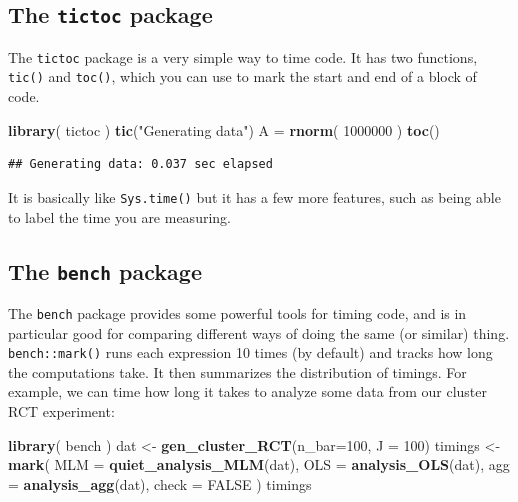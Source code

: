 \documentclass[
]{book}
\newenvironment{Shaded}{\begin{snugshade}}{\end{snugshade}}
\newcommand{\AttributeTok}[1]{\textcolor[rgb]{0.13,0.29,0.53}{#1}}
\newcommand{\ConstantTok}[1]{\textcolor[rgb]{0.56,0.35,0.01}{#1}}
\newcommand{\DecValTok}[1]{\textcolor[rgb]{0.00,0.00,0.81}{#1}}
\newcommand{\FunctionTok}[1]{\textcolor[rgb]{0.13,0.29,0.53}{\textbf{#1}}}
\newcommand{\NormalTok}[1]{#1}
\newcommand{\OtherTok}[1]{\textcolor[rgb]{0.56,0.35,0.01}{#1}}
\newcommand{\StringTok}[1]{\textcolor[rgb]{0.31,0.60,0.02}{#1}}
\begin{document}
\subsection{\texorpdfstring{The \texttt{tictoc} package}{The tictoc package}}\label{the-tictoc-package}

The \texttt{tictoc} package is a very simple way to time code.
It has two functions, \texttt{tic()} and \texttt{toc()}, which you can use to mark the start and end of a block of code.

\begin{Shaded}
\begin{Highlighting}[]
\FunctionTok{library}\NormalTok{( tictoc )}
\FunctionTok{tic}\NormalTok{(}\StringTok{"Generating data"}\NormalTok{)}
\NormalTok{A }\OtherTok{=} \FunctionTok{rnorm}\NormalTok{( }\DecValTok{1000000}\NormalTok{ )}
\FunctionTok{toc}\NormalTok{()}
\end{Highlighting}
\end{Shaded}

\begin{verbatim}
## Generating data: 0.037 sec elapsed
\end{verbatim}

It is basically like \texttt{Sys.time()} but it has a few more features, such as being able to label the time you are measuring.

\subsection{\texorpdfstring{The \texttt{bench} package}{The bench package}}\label{the-bench-package}

The \texttt{bench} package provides some powerful tools for timing code, and is in particular good for comparing different ways of doing the same (or similar) thing.
\texttt{bench::mark()} runs each expression 10 times (by default) and tracks how long the computations take. It then summarizes the distribution of timings.
For example, we can time how long it takes to analyze some data from our cluster RCT experiment:

\begin{Shaded}
\begin{Highlighting}[]
\FunctionTok{library}\NormalTok{( bench )}
\NormalTok{dat }\OtherTok{\textless{}{-}} \FunctionTok{gen\_cluster\_RCT}\NormalTok{(}\AttributeTok{n\_bar=}\DecValTok{100}\NormalTok{, }\AttributeTok{J =} \DecValTok{100}\NormalTok{)}
\NormalTok{timings }\OtherTok{\textless{}{-}} \FunctionTok{mark}\NormalTok{(}
      \AttributeTok{MLM =} \FunctionTok{quiet\_analysis\_MLM}\NormalTok{(dat),}
      \AttributeTok{OLS =} \FunctionTok{analysis\_OLS}\NormalTok{(dat),}
      \AttributeTok{agg =} \FunctionTok{analysis\_agg}\NormalTok{(dat),}
      \AttributeTok{check =} \ConstantTok{FALSE}
\NormalTok{)}
\NormalTok{timings}
\end{Highlighting}
\end{Shaded}
\end{document}
